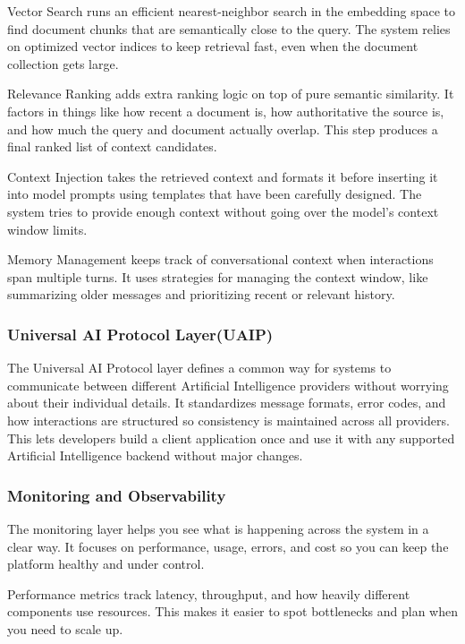 \documentclass[final,5p,times,twocolumn,authoryear,draft]{elsarticle}
\begin{document}
Vector Search runs an efficient nearest-neighbor search in the embedding space to find document chunks that are semantically close to the query. The system relies on optimized vector indices to keep retrieval fast, even when the document collection gets large.

Relevance Ranking adds extra ranking logic on top of pure semantic similarity. It factors in things like how recent a document is, how authoritative the source is, and how much the query and document actually overlap. This step produces a final ranked list of context candidates.

Context Injection takes the retrieved context and formats it before inserting it into model prompts using templates that have been carefully designed. The system tries to provide enough context without going over the model's context window limits.

Memory Management keeps track of conversational context when interactions span multiple turns. It uses strategies for managing the context window, like summarizing older messages and prioritizing recent or relevant history.

\subsubsection{Universal AI Protocol Layer(UAIP)}

The Universal AI Protocol layer defines a common way for systems to communicate between different Artificial Intelligence providers without worrying about their individual details. It standardizes message formats, error codes, and how interactions are structured so consistency is maintained across all providers. This lets developers build a client application once and use it with any supported Artificial Intelligence backend without major changes.

\subsubsection{Monitoring and Observability}

The monitoring layer helps you see what is happening across the system in a clear way. It focuses on performance, usage, errors, and cost so you can keep the platform healthy and under control.

Performance metrics track latency, throughput, and how heavily different components use resources. This makes it easier to spot bottlenecks and plan when you need to scale up.
\end{document}
